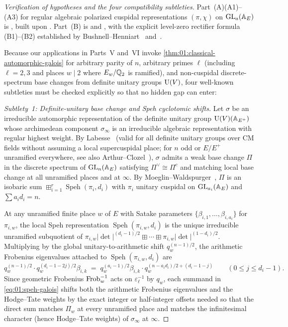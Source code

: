 \begin{proof}[Verification of hypotheses and the four compatibility subtleties]
Part~(A)(A1)--(A3) for regular algebraic polarized cuspidal representations $(\pi, \chi)$ on $\mathrm{GL}_a(\mathbb{A}_E)$ is \cite[Theorem~2.1.1]{BLGGT2014}, built upon \cite{Shin2011,ChenevierHarris2013,Caraiani2012,Caraiani2014}. Part~(B) is \cite[Theorem~VII.1.9]{HarrisTaylor2001} and \cite[Theorem~1.1]{Henniart2000}, with the explicit level-zero rectifier formula (B1)--(B2) established by Bushnell--Henniart~\cite[Theorem~2.1 and \S4]{BushnellHenniart2005} and~\cite{BushnellHenniart2011}.

Because our applications in Parts~V and~VI invoke \cref{thm:01:classical-automorphic-galois} for arbitrary parity of $n$, arbitrary primes $\ell$ (including $\ell = 2, 3$ and places $w \mid 2$ where $E_w/\mathbb{Q}_2$ is ramified), and non-cuspidal discrete-spectrum base changes from definite unitary groups $\mathrm{U}(V)$, four well-known subtleties must be checked explicitly so that no hidden gap can enter:

\medskip\noindent
\emph{Subtlety~1: Definite-unitary base change and Speh cyclotomic shifts.}
Let $\sigma$ be an irreducible automorphic representation of the definite unitary group $\mathrm{U}(V)(\mathbb{A}_{E^+})$ whose archimedean component $\sigma_\infty$ is an irreducible algebraic representation with regular highest weight. By Labesse~\cite[Corollaire~5.3]{Labesse2011} (valid for all definite unitary groups over CM fields without assuming a local supercuspidal place; for $n$ odd or $E/E^+$ unramified everywhere, see also Arthur--Clozel~\cite{ArthurClozel1989}), $\sigma$ admits a weak base change $\Pi$ in the discrete spectrum of $\mathrm{GL}_n(\mathbb{A}_E)$ satisfying $\Pi^\vee \cong \Pi^c$ and matching local base change at all unramified places and at $\infty$. By Moeglin--Waldspurger~\cite{MoeglinWaldspurger1989}, $\Pi$ is an isobaric sum $\boxplus_{i=1}^r \operatorname{Speh}(\pi_i, d_i)$ with $\pi_i$ unitary cuspidal on $\mathrm{GL}_{a_i}(\mathbb{A}_E)$ and $\sum a_i d_i = n$.

At any unramified finite place $w$ of $E$ with Satake parameters $\{\beta_{i,1}, \dots, \beta_{i,a_i}\}$ for $\pi_{i,w}$, the local Speh representation $\operatorname{Speh}(\pi_{i,w}, d_i)$ is the unique irreducible unramified subquotient of $\pi_{i,w}|\det|^{(d_i-1)/2} \boxplus \cdots \boxplus \pi_{i,w}|\det|^{(1-d_i)/2}$. Multiplying by the global unitary-to-arithmetic shift $q_w^{(n-1)/2}$, the arithmetic Frobenius eigenvalues attached to $\operatorname{Speh}(\pi_{i,w}, d_i)$ are
\[
  q_w^{(n-1)/2} \cdot q_w^{(d_i - 1 - 2j)/2} \beta_{i,k}
  \;=\; q_w^{(a_i - 1)/2} \beta_{i,k} \cdot q_w^{(n - a_i d_i)/2 + (d_i - 1 - j)}
  \qquad (0 \le j \le d_i - 1).
\]
Since geometric Frobenius $\mathrm{Frob}_w^{-1}$ acts on $\varepsilon_\ell^{-1}$ by $q_w$, each summand in \eqref{eq:01:speh-galois} shifts both the arithmetic Frobenius eigenvalues and the Hodge--Tate weights by the exact integer or half-integer offsets needed so that the direct sum matches $\Pi_w$ at every unramified place and matches the infinitesimal character (hence Hodge--Tate weights) of $\sigma_\infty$ at $\infty$.


\end{proof}
